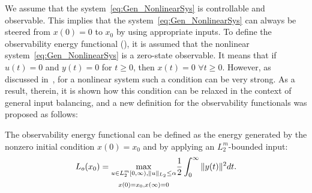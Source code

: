 We assume that the system~\eqref{eq:Gen_NonlinearSys} is controllable and observable. This implies that the system~\eqref{eq:Gen_NonlinearSys} can always be steered from $x(0) =0$ to $x_0$ by using appropriate inputs.
To define the observability energy functional (), it is assumed that the nonlinear system~\eqref{eq:Gen_NonlinearSys} is  a zero-state observable. It means that if $u(t) = 0$ and $y(t) =0$ for $t\geq 0$, then $x(t) = 0$ $\forall t\geq 0$. However, as discussed in~\cite{morgray1996}, for a nonlinear system such a condition can be very strong. As a result, therein, it is shown how this condition can be  relaxed in the context of general input balancing, and a new definition for the observability functionals was proposed as follows:


\begin{definition}\cite{morgray1996}\label{def:obser2}
	The observability energy functional can be defined as the  energy generated by the nonzero initial condition $x(0) = x_0$  and by applying an $L^m_2$-bounded input:
	 \begin{equation*}
	  L_o(x_0) = \underset{\begin{subarray}{c}
	  u\in L^m_2[0,\infty), \|u\|_{L_2} \leq \alpha \\[5pt]
	  x(0) = x_0,x(\infty)=0
	   \end{subarray}  }{\max} \dfrac{1}{2}\int_0^\infty \|y(t)\|^2dt.
	  \end{equation*}
\end{definition}

